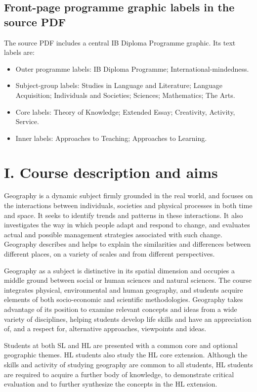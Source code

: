 \documentclass[11pt,a4paper]{article}
\begin{document}
\subsection*{Front-page programme graphic labels in the source PDF}
The source PDF includes a central IB Diploma Programme graphic. Its text labels are:
\begin{itemize}
    \item Outer programme labels: IB Diploma Programme; International-mindedness.
    \item Subject-group labels: Studies in Language and Literature; Language Acquisition;
    Individuals and Societies; Sciences; Mathematics; The Arts.
    \item Core labels: Theory of Knowledge; Extended Essay; Creativity, Activity, Service.
    \item Inner labels: Approaches to Teaching; Approaches to Learning.
\end{itemize}

\section*{I. Course description and aims}

Geography is a dynamic subject firmly grounded in the real world, and focuses on
the interactions between individuals, societies and physical processes in both
time and space. It seeks to identify trends and patterns in these interactions.
It also investigates the way in which people adapt and respond to change, and
evaluates actual and possible management strategies associated with such change.
Geography describes and helps to explain the similarities and differences between
different places, on a variety of scales and from different perspectives.

Geography as a subject is distinctive in its spatial dimension and occupies a
middle ground between social or human sciences and natural sciences. The course
integrates physical, environmental and human geography, and students acquire
elements of both socio-economic and scientific methodologies. Geography takes
advantage of its position to examine relevant concepts and ideas from a wide
variety of disciplines, helping students develop life skills and have an
appreciation of, and a respect for, alternative approaches, viewpoints and ideas.

Students at both SL and HL are presented with a common core and optional
geographic themes. HL students also study the HL core extension. Although the
skills and activity of studying geography are common to all students, HL students
are required to acquire a further body of knowledge, to demonstrate critical
evaluation and to further synthesize the concepts in the HL extension.
\end{document}
